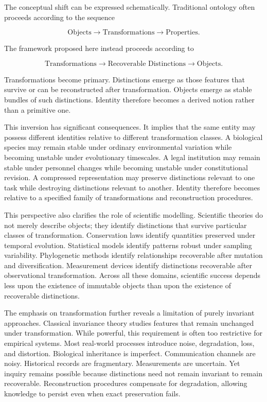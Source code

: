 \documentclass[12pt,oneside]{article}
\theoremstyle{definition}
\begin{document}
The conceptual shift can be expressed schematically. Traditional ontology often proceeds according to the sequence

\[
\text{Objects}
\longrightarrow
\text{Transformations}
\longrightarrow
\text{Properties}.
\]

The framework proposed here instead proceeds according to

\[
\text{Transformations}
\longrightarrow
\text{Recoverable Distinctions}
\longrightarrow
\text{Objects}.
\]

Transformations become primary. Distinctions emerge as those features that survive or can be reconstructed after transformation. Objects emerge as stable bundles of such distinctions. Identity therefore becomes a derived notion rather than a primitive one.

This inversion has significant consequences. It implies that the same entity may possess different identities relative to different transformation classes. A biological species may remain stable under ordinary environmental variation while becoming unstable under evolutionary timescales. A legal institution may remain stable under personnel changes while becoming unstable under constitutional revision. A compressed representation may preserve distinctions relevant to one task while destroying distinctions relevant to another. Identity therefore becomes relative to a specified family of transformations and reconstruction procedures.

This perspective also clarifies the role of scientific modelling. Scientific theories do not merely describe objects; they identify distinctions that survive particular classes of transformation. Conservation laws identify quantities preserved under temporal evolution. Statistical models identify patterns robust under sampling variability. Phylogenetic methods identify relationships recoverable after mutation and diversification. Measurement devices identify distinctions recoverable after observational transformation. Across all these domains, scientific success depends less upon the existence of immutable objects than upon the existence of recoverable distinctions.

The emphasis on transformation further reveals a limitation of purely invariant approaches. Classical invariance theory studies features that remain unchanged under transformation. While powerful, this requirement is often too restrictive for empirical systems. Most real-world processes introduce noise, degradation, loss, and distortion. Biological inheritance is imperfect. Communication channels are noisy. Historical records are fragmentary. Measurements are uncertain. Yet inquiry remains possible because distinctions need not remain invariant to remain recoverable. Reconstruction procedures compensate for degradation, allowing knowledge to persist even when exact preservation fails.
\end{document}
